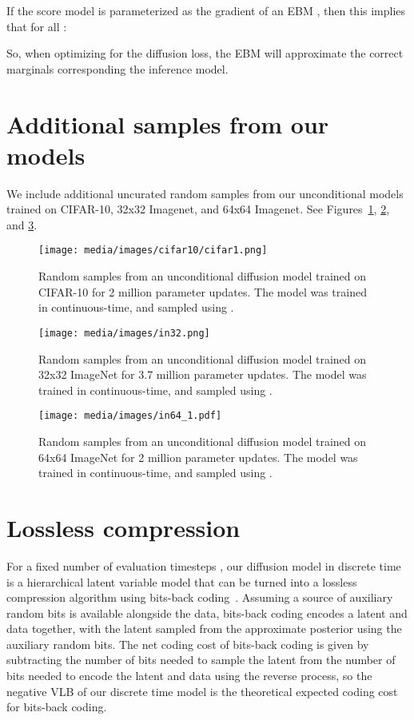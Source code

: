 \documentclass{article}
\begin{document}
If the score model is parameterized as the gradient of an EBM , then this implies that for all :

So, when optimizing for the diffusion loss, the EBM  will approximate the correct marginals corresponding the inference model.



\section{Additional samples from our models}
\label{sec:app_more_samples}
We include additional uncurated random samples from our unconditional models trained on CIFAR-10, 32x32 Imagenet, and 64x64 Imagenet. See Figures~\ref{fig:extracifar}, \ref{fig:in32}, and \ref{fig:in64}.

\begin{figure}[htb]
    \centering
    \texttt{[image: media/images/cifar10/cifar1.png]}
    \caption{Random samples from an unconditional diffusion model trained on CIFAR-10 for 2 million parameter updates. The model was trained in continuous-time, and sampled using .}
    \label{fig:extracifar}
\end{figure}

\begin{figure}[htb]
    \centering
    \texttt{[image: media/images/in32.png]}
    \caption{Random samples from an unconditional diffusion model trained on 32x32 ImageNet for 3.7 million parameter updates. The model was trained in continuous-time, and sampled using .}
    \label{fig:in32}
\end{figure}

\begin{figure}[htb]
    \centering
    \texttt{[image: media/images/in64\_1.pdf]}
    \caption{Random samples from an unconditional diffusion model trained on 64x64 ImageNet for 2 million parameter updates. The model was trained in continuous-time, and sampled using .}
    \label{fig:in64}
\end{figure}

\section{Lossless compression}
\label{sec:compression}
For a fixed number of evaluation timesteps , our diffusion model in discrete time is a hierarchical latent variable model that can be turned into a lossless compression algorithm using bits-back coding~\citep{hinton1993keeping}. Assuming a source of auxiliary random bits is available alongside the data, bits-back coding encodes a latent and data together, with the latent sampled from the approximate posterior using the auxiliary random bits. The net coding cost of bits-back coding is given by subtracting the number of bits needed to sample the latent from the number of bits needed to encode the latent and data using the reverse process, so the negative VLB of our discrete time model is the theoretical expected coding cost for bits-back coding.
\end{document}
